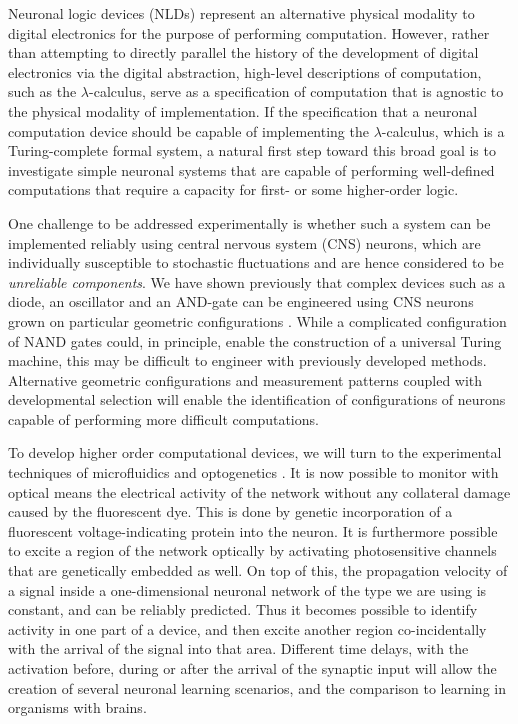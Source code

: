 Neuronal logic devices (NLDs) represent an alternative physical modality
to digital electronics for the purpose of performing computation.
However, rather than attempting to directly parallel the history of the
development of digital electronics via the digital abstraction,
high-level descriptions of computation, such as the
$\lambda$-calculus, serve as a specification
of computation that is agnostic to the physical modality of
implementation. If the specification that a neuronal computation device
should be capable of implementing the
$\lambda$-calculus, which is a Turing-complete formal system, a natural first step
toward this broad goal is to investigate simple neuronal systems that
are capable of performing well-defined computations that require a
capacity for first- or some higher-order logic.

One challenge to be addressed experimentally is whether such a system can be implemented reliably using central nervous system (CNS) neurons, which are individually susceptible to stochastic fluctuations and are hence considered to be {\it unreliable components}. We have shown previously that complex devices such as a diode, an oscillator and an AND-gate can be engineered using CNS neurons grown on particular geometric configurations \cite{Feinerman2008}. While a complicated configuration of NAND gates could, in principle, enable the construction of a universal Turing machine, this may be difficult to engineer with previously developed methods. Alternative geometric configurations and measurement patterns coupled with developmental selection will enable the identification of configurations of neurons capable of performing more difficult computations.

To develop higher order computational devices, we will turn to the experimental techniques of microfluidics and optogenetics \cite{Yizhar2011,Kralj2012}.
It is now possible to monitor with optical means the electrical activity of the network without any collateral damage caused by the fluorescent dye. This is done by genetic incorporation of a fluorescent voltage-indicating protein into the neuron. It is furthermore possible to excite a region of the network optically by activating photosensitive channels that are genetically embedded as well. On top of this, the propagation velocity of a signal inside a one-dimensional neuronal network of the type we are using is constant, and can be reliably predicted. Thus it becomes possible to identify activity in one part of a device, and then excite another region co-incidentally with the arrival of the signal into that area. Different time delays, with the activation before, during or after the arrival of the synaptic input will allow the creation of several neuronal learning scenarios, and the comparison to learning in organisms with brains.

